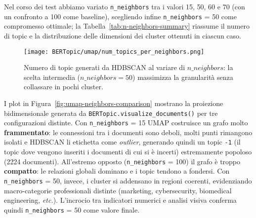 \begin{table}[H]
\centering
{\setlength{\tabcolsep}{4pt}
}
\caption{Sintesi degli esperimenti al variare di $n\_neighbors$: numero di topic trovati, dimensione media e deviazione standard dei cluster, oltre al conteggio dei topic piccoli ($<100$ documenti), di quelli molto grandi ($>500$ documenti) e al totale di documenti assegnati.}
\label{tab:n-neighbors-summary}
\end{table}

\noindent Nel corso dei test abbiamo variato \texttt{n\_neighbors} tra i valori 15, 50, 60 e 70 (con un confronto a 100 come baseline), scegliendo infine \texttt{n\_neighbors} = 50 come compromesso ottimale; la Tabella~\ref{tab:n-neighbors-summary} riassume il numero di topic e la distribuzione delle dimensioni dei cluster ottenuti in ciascun caso.

\begin{figure}[H]
\centering
\texttt{[image: BERTopic/umap/num\_topics\_per\_neighbors.png]}
\caption{Numero di topic generati da HDBSCAN al variare di $n\_neighbors$: la scelta intermedia ($n\_neighbors=50$) massimizza la granularità senza collassare in pochi cluster.}
\label{fig:num-topics-per-neighbors}
\end{figure}
\noindent I plot in Figura~\ref{fig:umap-neighbors-comparison} mostrano la proiezione bidimensionale generata da \texttt{BERTopic.\allowbreak visualize\_documents()} per tre configurazioni distinte. Con \texttt{n\_neighbors} = 15 UMAP costruisce un grafo molto \textbf{frammentato}: le connessioni tra i documenti sono deboli, molti punti rimangono isolati e HDBSCAN li etichetta come \textit{outlier}, generando quindi un topic \texttt{-1} (il topic dove vengono inseriti i documenti di cui si è incerti) estremamente popoloso (2224 documenti). All'estremo opposto (\texttt{n\_neighbors} = 100) il grafo è troppo \textbf{compatto}: le relazioni globali dominano e i topic tendono a fondersi. Con \texttt{n\_neighbors} = 50, invece, i cluster si addensano in regioni coerenti, evidenziando macro-categorie professionali distinte (marketing, cybersecurity, biomedical engineering, \emph{etc.}). L'incrocio tra indicatori numerici e analisi visiva conferma quindi \texttt{n\_neighbors} = 50 come valore finale.

